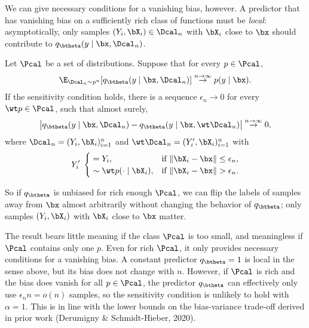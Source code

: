 \documentclass[aspectratio=169,10pt]{beamer}
\newcommand{\currentheading}{\ifx\insertsubsection\empty\insertsection\else\insertsubsection\fi}
\begin{document}
\begin{frame}{\currentheading}
We can give necessary conditions for a vanishing bias, however. A predictor that has vanishing bias on a sufficiently rich class of functions must be \emph{local}: asymptotically, only samples $(Y_i, \bX_i) \in \Dcal_n$ with $\bX_i$ close to $\bx$ should contribute to $q_{\btheta}(y \mid \bx, \Dcal_n)$.
\end{frame}

\begin{frame}{\currentheading}
\small
\begin{theorem}[5.4]\label{thm:unbiased}
Let $\Pcal$ be a set of distributions. Suppose that for every $p \in \Pcal$,
\begin{align*}
	\E_{\Dcal_n \sim p^n}[q_{\btheta}(y \mid \bx, \Dcal_n)] \stackrel{n \to \infty}\rightarrow p(y \mid \bx).
\end{align*}
If the sensitivity condition holds, there is a sequence $\epsilon_n \to 0$ for every $\wt p \in \Pcal$, such that almost surely,
\begin{align*}
	 \bigl| q_{\btheta}(y \mid \bx, \Dcal_n) - 	 q_{\btheta}(y \mid \bx, \wt \Dcal_n)  \bigr| \stackrel{n \to \infty}\rightarrow  0,
\end{align*}
where $\Dcal_n = (Y_i, \bX_i)_{i = 1}^n$ and $\wt \Dcal_n = (Y_i', \bX_i)_{i = 1}^n$ with
\begin{align*}
	Y_i'\; \begin{cases}
		\; = Y_i, & \text{if } \|\bX_i - \bx\| \le \epsilon_n, \\
		\; \sim \wt p( \cdot \mid \bX_i), &  \text{if } \|\bX_i - \bx\| > \epsilon_n.
	\end{cases}
\end{align*}
\end{theorem}
\end{frame}

\begin{frame}{\currentheading}
So if $q_{\btheta}$ is unbiased for rich enough $\Pcal$, we can flip the labels of samples away from $\bx$ almost arbitrarily without changing the behavior of $q_{\btheta}$; only samples $(Y_i, \bX_i)$ with $\bX_i$ close to $\bx$ matter.
\end{frame}

\begin{frame}{\currentheading}
The result bears little meaning if the class $\Pcal$ is too small, and meaningless if $\Pcal$ contains only one $p$. Even for rich $\Pcal$, it only provides necessary conditions for a vanishing bias. A constant predictor $q_{\btheta} = 1$ is local in the sense above, but its bias does not change with $n$. However, if $\Pcal$ is rich and the bias does vanish for all $p \in \Pcal$, the predictor $q_{\btheta}$ can effectively only use $\epsilon_n n = o(n)$ samples, so the sensitivity condition is unlikely to hold with $\alpha = 1$. This is in line with the lower bounds on the bias-variance trade-off derived in prior work (Derumigny \& Schmidt-Hieber, 2020).
\end{frame}
\end{document}
